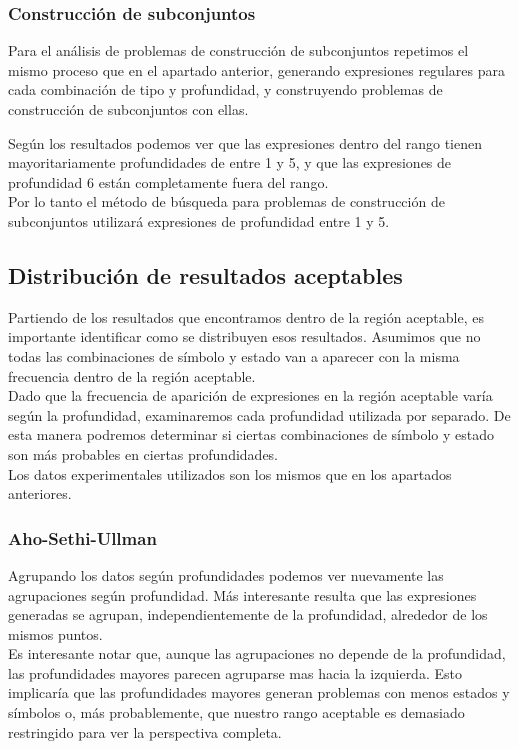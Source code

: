 \subsubsection{Construcción de subconjuntos}

Para el análisis de problemas de construcción de subconjuntos repetimos el mismo proceso que en el apartado anterior, generando expresiones regulares para cada combinación de tipo y profundidad, y construyendo problemas de construcción de subconjuntos con ellas.


Según los resultados podemos ver que las expresiones dentro del rango tienen mayoritariamente profundidades de entre 1 y 5, y que las expresiones de profundidad 6 están completamente fuera del rango.
\\
Por lo tanto el método de búsqueda para problemas de construcción de subconjuntos utilizará expresiones de profundidad entre 1 y 5.

\subsection{Distribución de resultados aceptables}

Partiendo de los resultados que encontramos dentro de la región aceptable, es importante identificar como se distribuyen esos resultados.
Asumimos que no todas las combinaciones de símbolo y estado van a aparecer con la misma frecuencia dentro de la región aceptable.
\\
Dado que la frecuencia de aparición de expresiones en la región aceptable varía según la profundidad, examinaremos cada profundidad utilizada por separado.
De esta manera podremos determinar si ciertas combinaciones de símbolo y estado son más probables en ciertas profundidades.
\\
Los datos experimentales utilizados son los mismos que en los apartados anteriores.

\subsubsection{Aho-Sethi-Ullman}

Agrupando los datos según profundidades podemos ver nuevamente las agrupaciones según profundidad.
Más interesante resulta que las expresiones generadas se agrupan, independientemente de la profundidad, alrededor de los mismos puntos.
\\
Es interesante notar que, aunque las agrupaciones no depende de la profundidad, las profundidades mayores parecen agruparse mas hacia la izquierda.
Esto implicaría que las profundidades mayores generan problemas con menos estados y símbolos o, más probablemente, que nuestro rango aceptable es demasiado restringido para ver la perspectiva completa.

